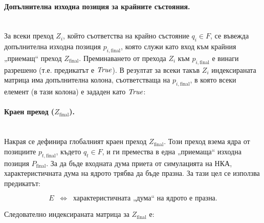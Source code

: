 \paragraph{Допълнителна изходна позиция за крайните състояния.}
\mbox{}\\
За всеки преход $Z_i$, който съответства на крайно състояние $q_i \in F$, се въвежда допълнителна изходна позиция $p_{i,\text{final}}$, която служи като вход към крайния „приемащ“ преход $Z_{\text{final}}$.  
Преминаването от прехода \(Z_i\) към \(p_{i,\text{final}}\) е винаги разрешено (т.е. предикатът е $\text{\textit{True}}$).  
В резултат за всеки такъв $Z_i$ индексираната матрица има допълнителна колона, съответстваща на $p_{i,\text{final}}$, в която всеки елемент (в тази колона) е зададен като $\text{\textit{True}}$:

\begin{center}
\end{center}

\paragraph{Краен преход ($Z_{\text{final}}$).}
\mbox{}\\
Накрая се дефинира глобалният краен преход $Z_{\text{final}}$.  
Този преход взема ядра от позициите $p_{t,\text{final}}$, където $q_t \in F$, и ги премества в една „приемаща“ изходна позиция $P_{\text{final}}$.  
За да бъде входната дума приета от симулацията на НКА, характеристичната дума на ядрото трябва да бъде празна. 
За тази цел се използва предикатът:

\[
E \;\;\Longleftrightarrow\;\; \text{характеристичната „дума“ на ядрото е празна.}
\]

Следователно индексираната матрица за $Z_{\text{final}}$ е:

\begin{center}
\end{center}

